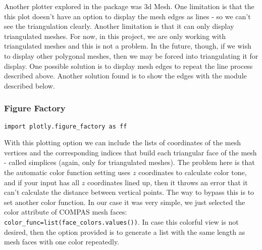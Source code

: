 Another plotter explored in the package was 3d Mesh. One limitation is that the this plot doesn't have an option to display the mesh edges as lines - so we can't see the triangulation clearly. Another limitation is that it can only display triangulated meshes. For now, in this project, we are only working with triangulated meshes and this is not a problem. In the future, though, if we wish to display other polygonal meshes, then we may be forced into triangulating it for display. One possible solution is to display mesh edges to repeat the line process described above. Another solution found is to show the edges with the module described below.

\subsubsection{Figure Factory}

\begin{lstlisting}
import plotly.figure_factory as ff
\end{lstlisting}

With this plotting option we can include the lists of coordinates of the mesh vertices and the corresponding indices that build each triangular face of the mesh - called simplices (again, only for triangulated meshes). The problem here is that the automatic color function setting uses $z$ coordinates to calculate color tone, and if your input has all $z$ coordinates lined up, then it throws an error that it can't calculate the distance between vertical points. The way to bypass this is to set another color function. In our case it was very simple, we just selected the color attribute of COMPAS mesh faces: \lstinline{color_func=list(face_colors.values())}. 
In case this colorful view is not desired, then the option provided is to generate a list with the same length as mesh faces with one color repeatedly. 



